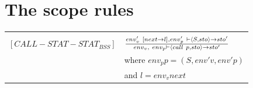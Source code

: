 \section{The scope rules}\label{sec:scope-rules}




\begin{center}
\begin{tabular}{ l l}
\hline
& \\
$[CALL-STAT-STAT_{BSS}]$ & $env'_{v}~[next \rightarrow l], env'_{p}~ \vdash \langle S,sto \rangle \rightarrow sto' \over env_{v}, ~ env_{p} \vdash \langle call~p, sto \rangle \rightarrow sto'$ \\
& where $env_{p}p = (S,env'{v},env'{p})$ \\
& and $l = env_{v}next$ \\
\hline
\end{tabular}
\end{center}







